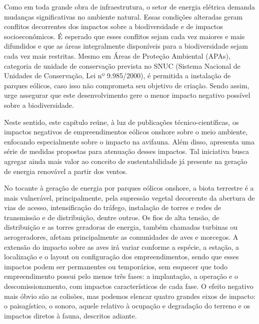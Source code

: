 \documentclass[
  oneside]{scrbook}
\begin{document}
Como em toda grande obra de infraestrutura, o setor de energia elétrica demanda mudanças significativas no ambiente natural. Essas condições alteradas geram conflitos decorrentes dos impactos sobre a biodiversidade e de impactos socioeconômicos. É esperado que esses conflitos sejam cada vez maiores e mais difundidos e que as áreas integralmente disponíveis para a biodiversidade sejam cada vez mais restritas. Mesmo em Áreas de Proteção Ambiental (APAs), categoria de unidade de conservação prevista no SNUC (Sistema Nacional de Unidades de Conservação, Lei nº 9.985/2000), é permitida a instalação de parques eólicos, caso isso não comprometa seu objetivo de criação. Sendo assim, urge assegurar que este desenvolvimento gere o menor impacto negativo possível sobre a biodiversidade.

Neste sentido, este capítulo reúne, à luz de publicações técnico-científicas, os impactos negativos de empreendimentos eólicos onshore sobre o meio ambiente, enfocando especialmente sobre o impacto na avifauna. Além disso, apresenta uma série de medidas propostas para atenuação desses impactos. Tal iniciativa busca agregar ainda mais valor ao conceito de sustentabilidade já presente na geração de energia renovável a partir dos ventos.

No tocante à geração de energia por parques eólicos onshore, a biota terrestre é a mais vulnerável, principalmente, pela supressão vegetal decorrente da abertura de vias de acesso, intensificação do tráfego, instalação de torres e redes de transmissão e de distribuição, dentre outros. Os fios de alta tensão, de distribuição e as torres geradoras de energia, também chamadas turbinas ou aerogeradores, afetam principalmente as comunidades de aves e morcegos. A extensão do impacto sobre as aves irá variar conforme a espécie, a estação, a localização e o layout ou configuração dos empreendimentos, sendo que esses impactos podem ser permanentes ou temporários, sem esquecer que todo empreendimento possui pelo menos três fases: a implantação, a operação e o descomissionamento, com impactos característicos de cada fase. O efeito negativo mais óbvio são as colisões, mas podemos elencar quatro grandes eixos de impacto: o paisagístico, o sonoro, aquele relativo à ocupação e degradação do terreno e os impactos diretos à fauna, descritos adiante.
\end{document}
